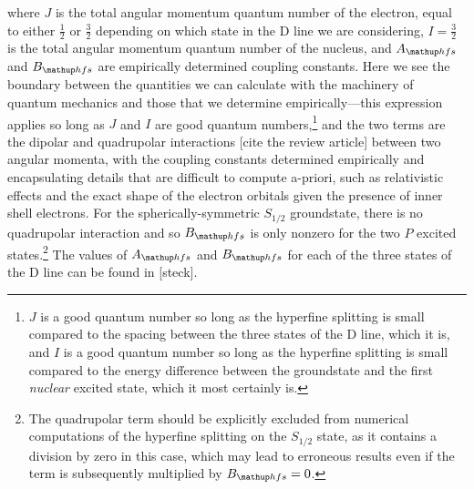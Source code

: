 where $J$ is the total angular momentum quantum number of the electron, equal to either $\frac12$ or $\frac32$ depending on which state in the D line we are considering, $I=\frac32$ is the total angular momentum quantum number of the nucleus, and $A_\up{hfs}$ and $B_\up{hfs}$ are empirically determined coupling constants. Here we see the boundary between the quantities we can calculate with the machinery of quantum mechanics and those that we determine empirically---this expression applies so long as $J$ and $I$ are good quantum numbers,\footnote{$J$ is a good quantum number so long as the hyperfine splitting is small compared to the spacing between the three states of the D line, which it is, and $I$ is a good quantum number so long as the hyperfine splitting is small compared to the energy difference between the groundstate and the first \emph{nuclear} excited state, which it most certainly is.} and the two terms are the dipolar and quadrupolar interactions [cite the review article] between two angular momenta, with the coupling constants determined empirically and encapsulating details that are difficult to compute a-priori, such as relativistic effects and the exact shape of the electron orbitals given the presence of inner shell electrons. For the spherically-symmetric $S_{1/2}$ groundstate, there is no quadrupolar interaction and so $B_\up{hfs}$ is only nonzero for the two $P$ excited states.\footnote{The quadrupolar term should be explicitly excluded from numerical computations of the hyperfine splitting on the $S_{1/2}$ state, as it contains a division by zero in this case, which may lead to erroneous results even if the term is subsequently multiplied by $B_\up{hfs}=0$.} The values of $A_\up{hfs}$ and $B_\up{hfs}$ for each of the three states of the D line can be found in [steck].

